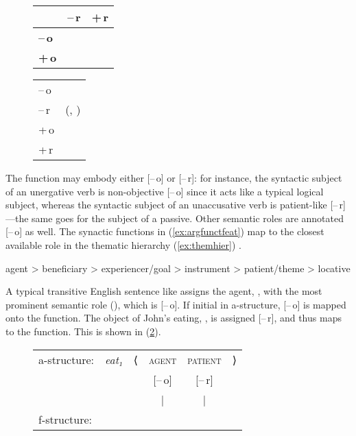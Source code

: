 \begin{figure}
\pex\label{ex:argfunctfeat}
\a\label{ex:argfunctfeat_1}%
	\begin{tabu}[t]{>{\bfseries}l c c}
	& \textbf{–\,r}
	& \textbf{+\,r}
	\\

	\midrule

	–\,o
	& \Subj
	& \Oblique
	\\

	+\,o
	& \Obj
	& \SObj
	\\

	\bottomrule
	\end{tabu}

\a\label{ex:argfunctfeat_2}%
	\begin{tabular}[t]{@{} l @{\quad$\mapsto$\quad} l}
	–\,o	&	\Subj\\
	–\,r	&	\Obj(, \Subj)\\
	+\,o	&	\SObj\\
	+\,r	&	\Oblique\\
	\end{tabular}
\xe
\end{figure}

The \Subj{} function may embody either [–\,o] or [–\,r]: for instance, the
syntactic subject of an unergative verb is non-objective [–\,o] since it acts
like a typical logical subject, whereas the syntactic subject of an
unaccusative verb is patient-like \mbox{[–\,r]}---the same goes for the subject
of a passive. Other semantic roles are annotated [–\,o] as well. The synactic
functions in (\ref{ex:argfunctfeat}) map to the closest available role in the
thematic hierarchy (\ref{ex:themhier}) \citep[329]{bresnan2016}.

\ex\label{ex:themhier}%
	agent > beneficiary > experiencer/goal > instrument > patient/theme >
	locative
\xe

A typical transitive English sentence like  assigns
the agent, , with the most prominent semantic role (\thetaroof), which
is [–\,o]. If initial in a-structure, [–\,o] is mapped onto the \Subj{}
function. The object of John's eating, , is assigned [–\,r], and
thus maps to the \Obj{} function. This is shown in (\ref{ex:engactive}).

\begin{figure}[ht]
\ex\label{ex:engactive}
\begin{tabular}[t]{l >{\itshape}l l c c r}
a-structure:
	& eat₁
	& ⟨
	& \textsc{agent}
	& \textsc{patient}
	& ⟩
	\\
%
	& %
	& %
	& [–\,o]
	& [–\,r]
	& %
	\\

%
	& %
	& %
	& |
	& |
	& %
	\\

f-structure:
	& %
	& %
	& \Subj
	& \Obj
	& %
	\\
\end{tabular}
\xe
\end{figure}

